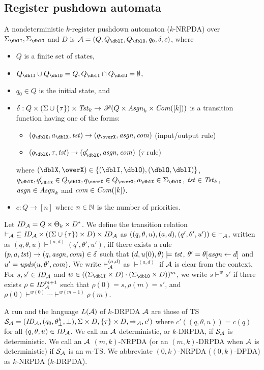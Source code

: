 \subsection{Register pushdown automata}\label{sec:RA}
\begin{definition}
A nondeterministic $k$-register pushdown automaton ($k$-NRPDA) over $\Sigma_\dblI,\Sigma_\dblO$ and $D$ is $\calA=(Q, Q_\dblI, Q_\dblO, q_0, \delta, c)$, where
\begin{itemize}
\item $Q$ is a finite set of states,
\item $Q_\dblI\cup Q_\dblO = Q, Q_\dblI\cap Q_\dblO = \emptyset$,
\item $q_0\in Q$ is the initial state, and
\item $\delta: Q \times (\Sigma\cup\{\tau\})\times \mathit{Tst}_k \to \mathscr{P}(Q \times\mathit{Asgn}_k\times \mathit{Com}([k]))$ is a transition function having one of the forms:
\begin{itemize}
\item $(q_\dblX,a_\dblX,\tst)\to(q_\overX,\asgn,\com)$ (input/output rule)
\item $(q_\dblX,\tau,\tst)\to(q'_\dblX,\asgn,\com)$ ($\tau$ rule)
\end{itemize}
where $(\dblX, \overX)\in\{(\dblI, \dblO), (\dblO,\dblI)\}$,
$q_\dblX, q'_\dblX\in Q_\dblX, q_\overX\in Q_\overX, a_\dblX\in \Sigma_\dblX$, $\mathit{tst}\in\mathit{Tst}_k$, $\mathit{asgn}\in\mathit{Asgn}_k$ and $\mathit{com}\in\mathit{Com}([k])$.
\item $c: Q \to [n]$ where $n\in \mathbb{N}$ is the number of priorities.
\end{itemize}
\end{definition}
\noindent
Let $\mathit{ID}_{\cal A}= Q\times \Theta_k\times D^*$.
We define the transition relation $\vdash_{\cal A}\ \subseteq\mathit{ID}_{\cal A}\times ((\Sigma\cup\{\tau\})\times D)\times \mathit{ID}_{\cal A}$ as
$((q,\theta,u), (a,d), (q',\theta',u'))\in\ \vdash_\calA$,
written as $(q,\theta,u)\vdash^{(a,d)}(q',\theta',u')$, iff
there exists a rule $(p, a, \mathit{tst}) \to (q, \mathit{asgn}, \mathit{com}) \in \delta$
such that
$(d, u(0), \theta)\models\mathit{tst}$, $\theta' = \theta[\mathit{asgn}\leftarrow d]$ and
$u'= \mathit{upds}(u,\theta',\mathit{com})$.
We write $\vdash^{(a,d)}_{\cal A}$ as $\vdash^{(a,d)}$ if ${\cal A}$ is clear from the context.
For $s,s'\in\mathit{ID}_{\cal A}$ and
$w\in((\Sigma_\dblI\times D)\cdot (\Sigma_\dblO\times D))^{m}$,
we write $s\vdash^{w}s'$ if
there exists $\rho\in\mathit{ID}_{\cal A}^{m+1}$ such that
$\rho(0)=s, \rho(m)=s'$, and
$\rho(0)\vdash^{w(0)}\cdots\vdash^{w(m-1)}\rho(m)$.

A run and the language $L({\cal A})$ of $k$-DRPDA ${\cal A}$ are those of TS
${\cal S}_{\cal A}=(\mathit{ID}_{\cal A}, (q_0, \theta^k_\bot, \bot), \Sigma\times D, \{\tau\}\times D, \Rightarrow_{\cal A}, c')$ where
$c'((q,\theta,u))=c(q)$ for all $(q,\theta,u)\in\mathit{ID}_{\cal A}$.
We call an ${\cal A}$ deterministic, or $k$-DRPDA, if ${\cal S}_{\cal A}$ is deterministic.
We call an ${\cal A}$ $(m,k)$-NRPDA (or an $(m,k)$-DRPDA when ${\cal A}$ is deterministic)
if ${\cal S}_{\cal A}$ is an $m$-TS.
We abbreviate $(0,k)$-NRPDA ($(0,k)$-DPDA) as $k$-NRPDA ($k$-DRPDA).
